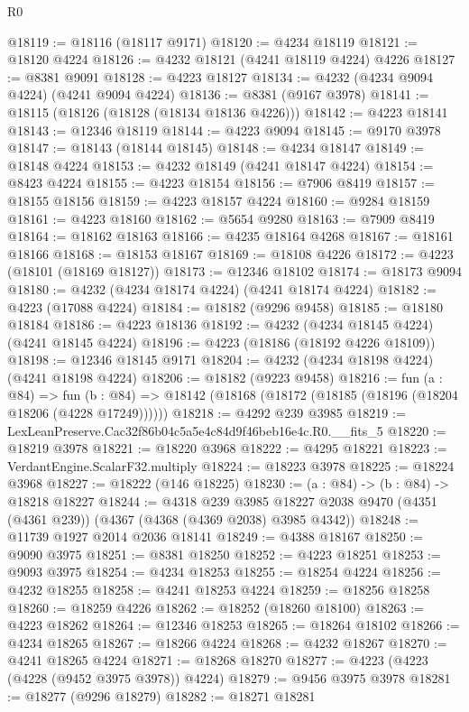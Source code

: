\begin{lexlean}{R0}
\begin{coremodule}
@18119 := @18116 (@18117 @9171)
@18120 := @4234 @18119
@18121 := @18120 @4224
@18126 := @4232 @18121 (@4241 @18119 @4224) @4226
@18127 := @8381 @9091
@18128 := @4223 @18127
@18134 := @4232 (@4234 @9094 @4224) (@4241 @9094 @4224)
@18136 := @8381 (@9167 @3978)
@18141 := @18115 (@18126 (@18128 (@18134 @18136 @4226)))
@18142 := @4223 @18141
@18143 := @12346 @18119
@18144 := @4223 @9094
@18145 := @9170 @3978
@18147 := @18143 (@18144 @18145)
@18148 := @4234 @18147
@18149 := @18148 @4224
@18153 := @4232 @18149 (@4241 @18147 @4224)
@18154 := @8423 @4224
@18155 := @4223 @18154
@18156 := @7906 @8419
@18157 := @18155 @18156
@18159 := @4223 @18157 @4224
@18160 := @9284 @18159
@18161 := @4223 @18160
@18162 := @5654 @9280
@18163 := @7909 @8419
@18164 := @18162 @18163
@18166 := @4235 @18164 @4268
@18167 := @18161 @18166
@18168 := @18153 @18167
@18169 := @18108 @4226
@18172 := @4223 (@18101 (@18169 @18127))
@18173 := @12346 @18102
@18174 := @18173 @9094
@18180 := @4232 (@4234 @18174 @4224) (@4241 @18174 @4224)
@18182 := @4223 (@17088 @4224)
@18184 := @18182 (@9296 @9458)
@18185 := @18180 @18184
@18186 := @4223 @18136
@18192 := @4232 (@4234 @18145 @4224) (@4241 @18145 @4224)
@18196 := @4223 (@18186 (@18192 @4226 @18109))
@18198 := @12346 @18145 @9171
@18204 := @4232 (@4234 @18198 @4224) (@4241 @18198 @4224)
@18206 := @18182 (@9223 @9458)
@18216 := fun (a : @84) =>
  fun (b : @84) => @18142 (@18168 (@18172 (@18185 (@18196 (@18204 @18206 (@4228 @17249))))))
@18218 := @4292 @239 @3985
@18219 := LexLeanPreserve.Cac32f86b04c5a5e4c84d9f46beb16e4c.R0.__fits_5
@18220 := @18219 @3978
@18221 := @18220 @3968
@18222 := @4295 @18221
@18223 := VerdantEngine.ScalarF32.multiply
@18224 := @18223 @3978
@18225 := @18224 @3968
@18227 := @18222 (@146 @18225)
@18230 := (a : @84) -> (b : @84) -> @18218 @18227
@18244 := @4318
    @239
    @3985
    @18227
    @2038
    @9470
    (@4351 (@4361 @239))
    (@4367 (@4368 (@4369 @2038) @3985 @4342))
@18248 := @11739 @1927 @2014 @2036 @18141
@18249 := @4388 @18167
@18250 := @9090 @3975
@18251 := @8381 @18250
@18252 := @4223 @18251
@18253 := @9093 @3975
@18254 := @4234 @18253
@18255 := @18254 @4224
@18256 := @4232 @18255
@18258 := @4241 @18253 @4224
@18259 := @18256 @18258
@18260 := @18259 @4226
@18262 := @18252 (@18260 @18100)
@18263 := @4223 @18262
@18264 := @12346 @18253
@18265 := @18264 @18102
@18266 := @4234 @18265
@18267 := @18266 @4224
@18268 := @4232 @18267
@18270 := @4241 @18265 @4224
@18271 := @18268 @18270
@18277 := @4223 (@4223 (@4228 (@9452 @3975 @3978)) @4224)
@18279 := @9456 @3975 @3978
@18281 := @18277 (@9296 @18279)
@18282 := @18271 @18281

\end{coremodule}
\end{lexlean}
